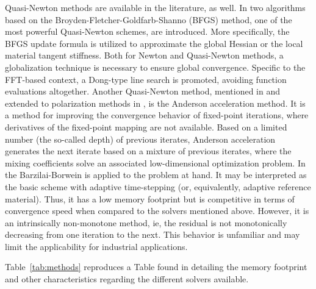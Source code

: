 Quasi-Newton methods are available in the literature, as well.
In \cite{wicht_quasinewton_2019} two algorithms based on the Broyden-Fletcher-Goldfarb-Shanno (BFGS) method, one of the most powerful Quasi-Newton schemes, are introduced.
More specifically, the BFGS update formula is utilized to approximate the global Hessian or the local material tangent stiffness.
Both for Newton and Quasi-Newton methods, a globalization technique is necessary to ensure global convergence.
Specific to the FFT-based context, a Dong-type line search is promoted, avoiding function evaluations altogether.
Another Quasi-Newton method, mentioned in \cite{wicht_quasinewton_2019} and extended to polarization methods in \cite{wicht_anderson-accelerated_2021}, is the Anderson acceleration method.
It is a method for improving the convergence behavior of fixed-point iterations, where derivatives of the fixed-point mapping are not available.
Based on a limited number (the so-called depth) of previous iterates, Anderson acceleration generates the next iterate based on a mixture of previous iterates, where the mixing coefficients
solve an associated low-dimensional optimization problem.
In \cite{schneider_barzilai-borwein_2019} the Barzilai-Borwein is applied to the problem at hand.
It may be interpreted as the basic scheme with adaptive time-stepping (or, equivalently, adaptive reference material).
Thus, it has a low memory footprint but is competitive in terms of convergence speed when compared to the solvers mentioned above.
However, it is an intrinsically non-monotone method, ie, the residual is not monotonically decreasing from one iteration to the next.
This behavior is unfamiliar and may limit the applicability for industrial applications.

Table~\ref{tab:methods} reproduces a Table found in \cite{wicht_quasinewton_2019} detailing the memory footprint and other characteristics regarding the different solvers available.



